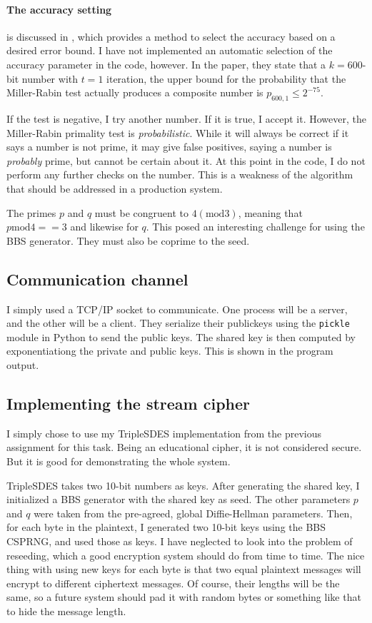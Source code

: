 \documentclass[a4paper,english,12pt]{article}
\begin{document}
\paragraph{The accuracy setting} is discussed in \cite{damgaard1993average}, which
provides a method to select the accuracy based on a desired error bound. I have
not implemented an automatic selection of the accuracy parameter in the code,
however. In the paper, they state that a $k=600$-bit number with $t=1$
iteration, the upper bound for the probability that the Miller-Rabin test
actually produces a composite number is $p_{600, 1} \leqslant 2^{-75}$.

If the test is negative, I try another number. If it is true, I accept
it. However, the Miller-Rabin primality test is \textit{probabilistic}. While
it will always be correct if it says a number is not prime, it may give false
positives, saying a number is \textit{probably} prime, but cannot be certain
about it. At this point in the code, I do not perform any further checks on the
number. This is a weakness of the algorithm that should be addressed in a
production system.

The primes $p$ and $q$ must be congruent to $4 (\textrm{mod} 3)$, meaning that
$p \textrm{mod} 4 == 3$ and likewise for $q$. This posed an interesting
challenge for using the BBS generator. They must also be coprime to the seed.

\subsection{Communication channel}
I simply used a TCP/IP socket to communicate. One process will be a server, and
the other will be a client. They serialize their publickeys using the
\texttt{pickle} module in Python to send the public keys. The shared key is
then computed by exponentiationg the private and public keys. This is shown in
the program output.

\subsection{Implementing the stream cipher}
I simply chose to use my TripleSDES implementation from the previous assignment
for this task. Being an educational cipher, it is not considered secure. But it
is good for demonstrating the whole system.

TripleSDES takes two 10-bit numbers as keys. After generating the shared key, I
initialized a BBS generator with the shared key as seed. The other parameters
$p$ and $q$ were taken from the pre-agreed, global Diffie-Hellman parameters.
Then, for each byte in the plaintext, I generated two 10-bit keys using the BBS
CSPRNG, and used those as keys. I have neglected to look into the problem of
reseeding, which a good encryption system should do from time to time. The nice
thing with using new keys for each byte is that two equal plaintext messages
will encrypt to different ciphertext messages. Of course, their lengths will be
the same, so a future system should pad it with random bytes or something like
that to hide the message length.
\end{document}
